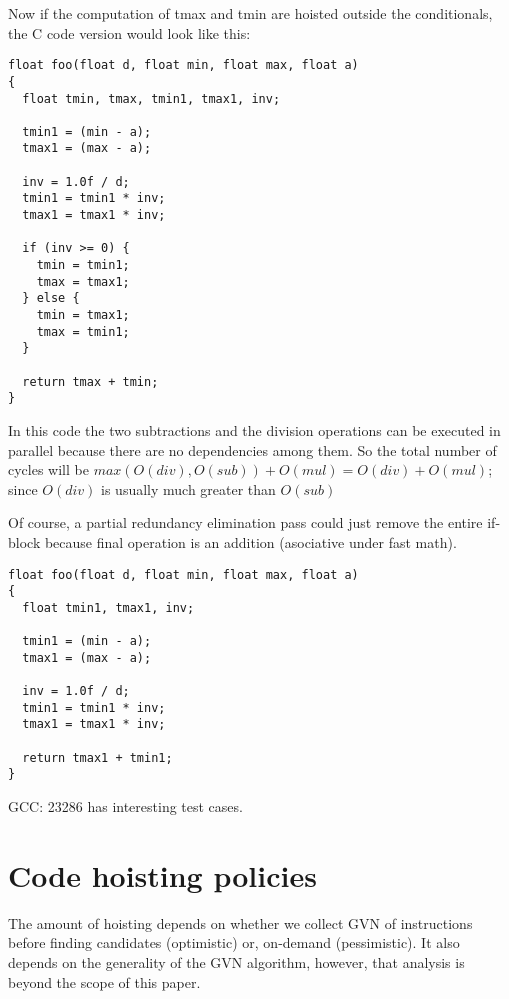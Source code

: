 \documentclass{sig-alternate}
\begin{document}
Now if the computation of tmax and tmin are hoisted outside the
conditionals, the C code version would look like this:
\begin{verbatim}
float foo(float d, float min, float max, float a)
{
  float tmin, tmax, tmin1, tmax1, inv;

  tmin1 = (min - a);
  tmax1 = (max - a);

  inv = 1.0f / d;
  tmin1 = tmin1 * inv;
  tmax1 = tmax1 * inv;

  if (inv >= 0) {
    tmin = tmin1;
    tmax = tmax1;
  } else {
    tmin = tmax1;
    tmax = tmin1;
  }

  return tmax + tmin;
}

\end{verbatim}

In this code the two subtractions and the division operations can be executed in
parallel because there are no dependencies among them. So the total number of
cycles will be $max(O(div), O(sub)) + O(mul) = O(div) + O(mul)$; since $O(div)$ is
usually much greater than $O(sub)$ \cite{x86,aarch64}

Of course, a partial redundancy elimination pass could just remove the entire
if-block because final operation is an addition (asociative under fast math).

\begin{verbatim}
float foo(float d, float min, float max, float a)
{
  float tmin1, tmax1, inv;

  tmin1 = (min - a);
  tmax1 = (max - a);

  inv = 1.0f / d;
  tmin1 = tmin1 * inv;
  tmax1 = tmax1 * inv;

  return tmax1 + tmin1;
}
\end{verbatim}


GCC: 23286 has interesting test cases.

\section{Code hoisting policies}
The amount of hoisting depends on whether we collect GVN of instructions
before finding candidates (optimistic) or, on-demand (pessimistic). It also
depends on the generality of the GVN algorithm, however, that analysis is beyond
the scope of this paper.
\end{document}
